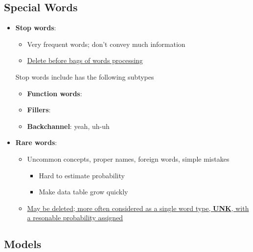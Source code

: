   \subsection{Special Words}

    \begin{itemize}
      \item \textbf{Stop words}:
      \begin{itemize}
        \item Very frequent words; don't convey much information
        \item \ul{Delete before bags of words processing}
      \end{itemize}

      Stop words include has the following subtypes
      \begin{itemize}
        \item \textbf{Function words}: 
        \item \textbf{Fillers}: 
        \item \textbf{Backchannel}: yeah, uh-uh
      \end{itemize}

      \item \textbf{Rare words}:
      \begin{itemize}
        \item Uncommon concepts, proper names, foreign words, simple mistakes
        \begin{itemize}
          \item Hard to estimate probability
          \item Make data table grow quickly
        \end{itemize}

        \item \ul{May be deleted; more often considered as a single word type,
        \textbf{UNK}, with a resonable probability assigned}
      \end{itemize}
    \end{itemize}

  \subsection{Models}

